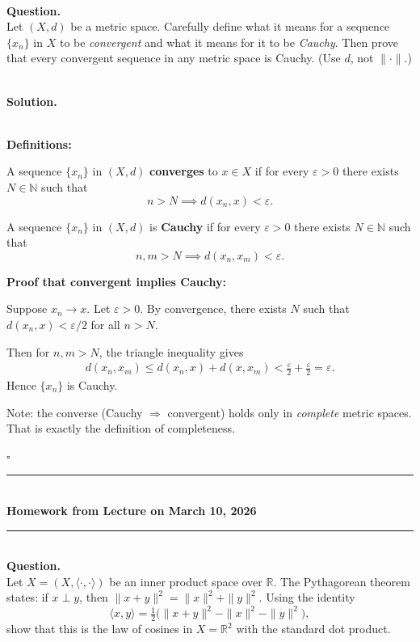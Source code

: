 \documentclass{article}
\begin{document}
\bigskip

\hfill \break  $~\!\!$ \dotfill \medskip \\
\textbf{Question.}\\
Let $(X, d)$ be a metric space. Carefully define what it means for a sequence $\{x_n\}$ in $X$ to be \emph{convergent} and what it means for it to be \emph{Cauchy}. Then prove that every convergent sequence in any metric space is Cauchy. (Use $d$, not $\|\cdot\|$.)

\noindent\\
\textbf{Solution.}\\
\quad\\
\begin{mdframed}[linewidth=1pt]
\textbf{Definitions:}

A sequence $\{x_n\}$ in $(X, d)$ \textbf{converges} to $x \in X$ if for every $\varepsilon > 0$ there exists $N \in \mathbb{N}$ such that
\[
n > N \implies d(x_n, x) < \varepsilon.
\]

A sequence $\{x_n\}$ in $(X, d)$ is \textbf{Cauchy} if for every $\varepsilon > 0$ there exists $N \in \mathbb{N}$ such that
\[
n, m > N \implies d(x_n, x_m) < \varepsilon.
\]

\textbf{Proof that convergent implies Cauchy:}

Suppose $x_n \to x$. Let $\varepsilon > 0$. By convergence, there exists $N$ such that $d(x_n, x) < \varepsilon/2$ for all $n > N$.

Then for $n, m > N$, the triangle inequality gives
\begin{align*}
d(x_n, x_m) \le d(x_n, x) + d(x, x_m) < \frac{\varepsilon}{2} + \frac{\varepsilon}{2} = \varepsilon.
\end{align*}
Hence $\{x_n\}$ is Cauchy.

Note: the converse (Cauchy $\Rightarrow$ convergent) holds only in \emph{complete} metric spaces. That is exactly the definition of completeness.

\hfill $\square$
\end{mdframed}

\bigskip
\begin{center}
\rule{0.5\textwidth}{1pt}\\[6pt]
\textbf{Homework from Lecture on March 10, 2026}\\[2pt]
\rule{0.5\textwidth}{1pt}
\end{center}
\bigskip

\hfill \break  $~\!\!$ \dotfill \medskip \\
\textbf{Question.}\\
Let $X = (X, \langle \cdot, \cdot \rangle)$ be an inner product space over $\mathbb{R}$. The Pythagorean theorem states: if $x \perp y$, then $\|x+y\|^2 = \|x\|^2 + \|y\|^2$. Using the identity
\[
\langle x,y \rangle = \tfrac{1}{2}\bigl(\|x+y\|^2 - \|x\|^2 - \|y\|^2\bigr),
\]
show that this is the law of cosines in $X = \mathbb{R}^2$ with the standard dot product.
\noindent\\
\end{document}
